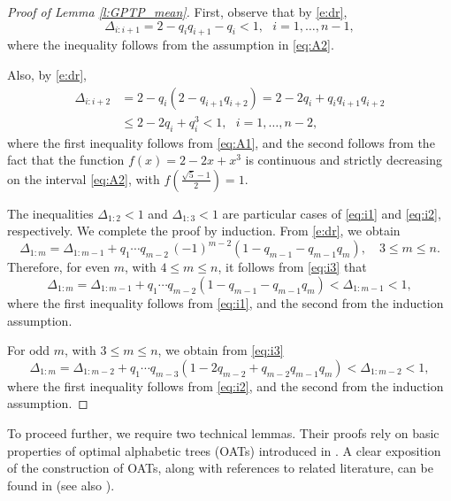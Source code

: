 \documentclass[12pt]{article}
\begin{document}
\begin{proof}[Proof of Lemma \ref{l:GPTP_mean}]
First, observe that by \eqref{e:dr},
\begin{equation}
\label{eq:i1}
\Delta_{i:i+1} = 2 - q_i q_{i+1} - q_i < 1,\,\,\,\,i=1,\ldots,n-1,
\end{equation}
where the inequality follows from the assumption in \eqref{eq:A2}.

Also, by \eqref{e:dr},
\begin{align}
\label{eq:i2}
\Delta_{i:i+2} &= 2 - q_i (2 - q_{i+1} q_{i+2})=2 - 2q_i +q_{i}q_{i+1} q_{i+2}\nonumber\\
&
\leq 2 - 2q_i + q_i^3 < 1,\,\,\,\,i=1,\ldots,n-2,
\end{align}
where the first inequality follows from \eqref{eq:A1}, and the second follows from the fact that the function \( f(x) = 2 - 2x + x^3 \) is continuous and strictly decreasing on the interval \eqref{eq:A2}, with \( f\left( \frac{\sqrt{5}-1}{2} \right) = 1 \).

The inequalities \( \Delta_{1:2} < 1 \) and \( \Delta_{1:3} < 1 \) are particular cases of \eqref{eq:i1} and \eqref{eq:i2}, respectively.
We complete the proof by induction. From \eqref{e:dr}, we obtain
\begin{equation}
\label{eq:i3}
    \Delta_{1:m} = \Delta_{1:m-1} + q_1 \cdots q_{m-2} \, (-1)^{m-2} \left( 1 - q_{m-1} - q_{m-1} q_m \right), \quad 3 \leq m \leq n.
\end{equation}
Therefore, for even \( m \), with \( 4 \leq m \leq n \), it follows from \eqref{eq:i3} that
\begin{equation*}
    \Delta_{1:m} = \Delta_{1:m-1} + q_1 \cdots q_{m-2} \left( 1 - q_{m-1} - q_{m-1} q_m \right) < \Delta_{1:m-1} < 1,
\end{equation*}
where the first inequality follows from \eqref{eq:i1}, and the second from the induction assumption.

For odd \( m \), with \( 3 \leq m \leq n \), we obtain from \eqref{eq:i3}
\begin{equation*}
\label{eq:i4}
    \Delta_{1:m} = \Delta_{1:m-2} + q_1 \cdots q_{m-3} \left( 1 - 2q_{m-2} + q_{m-2} q_{m-1} q_m \right) < \Delta_{1:m-2} < 1,
\end{equation*}
where the first inequality follows from \eqref{eq:i2}, and the second from the induction assumption.

\end{proof}



To proceed further, we require two technical lemmas. Their proofs rely on basic properties of optimal alphabetic trees (OATs) introduced in \cite{HT1971}. A clear exposition of the construction of OATs, along with references to related literature, can be found in \cite{D1998} (see also \cite{HS2002}).
\end{document}
